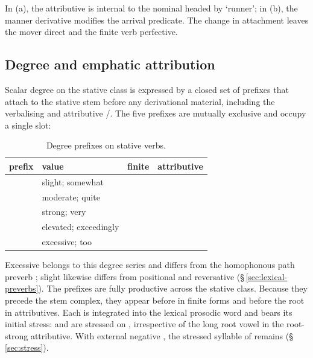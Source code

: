In (a), the attributive is internal to the nominal headed by `runner';
in (b), the manner derivative modifies the arrival predicate. The change
in attachment leaves the mover direct and the finite verb perfective.

\subsection{Degree and emphatic attribution}\label{sec:stative-degree}
Scalar degree on the stative class is expressed by a closed set of prefixes
that attach to the stative stem before any derivational material, including
the verbalising  and attributive /. The five prefixes are
mutually exclusive and occupy a single slot:

\begin{table}[ht]
  \footnotesize
  \caption{Degree prefixes on stative verbs.}\label{tab:degpfx}
  \begin{tabularx}{\textwidth}{l l L L}
    \toprule
    {\sc prefix} & {\sc value} & {\sc finite} & {\sc attributive} \\
    \midrule
      & slight; somewhat      &   &   \\
      & moderate; quite       &   &   \\
     & strong; very          &  &  \\
      & elevated; exceedingly &   &   \\
     & excessive; too        &  &  \\
    \bottomrule
  \end{tabularx}
\end{table}

\noindent Excessive  belongs to this degree series and differs
from the homophonous path preverb  ; slight
 likewise differs from positional and reversative 
(§\,\ref{sec:lexical-preverbs}). The prefixes are fully productive across
the stative class. Because
they precede the stem complex, they appear before  in finite forms
and before the root in attributives. Each is integrated into the lexical
prosodic word and bears its initial stress:  and
 are stressed on , irrespective of the long root
vowel in the root-strong attributive. With external negative , the stressed
syllable of  remains 
(§\,\ref{sec:stress}).

